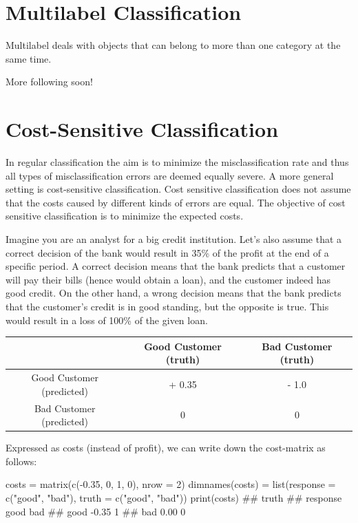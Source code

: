 \documentclass[12pt,]{scrbook}
\newenvironment{Shaded}{}{}
\newcommand{\DataTypeTok}[1]{#1}
\newcommand{\DecValTok}[1]{#1}
\newcommand{\FloatTok}[1]{#1}
\newcommand{\KeywordTok}[1]{\textcolor[rgb]{0.00,0.00,1.00}{#1}}
\newcommand{\NormalTok}[1]{#1}
\newcommand{\OperatorTok}[1]{#1}
\newcommand{\StringTok}[1]{\textcolor[rgb]{0.00,0.50,0.50}{#1}}
\begin{document}
\hypertarget{multilabel}{%
\section{Multilabel Classification}\label{multilabel}}

Multilabel deals with objects that can belong to more than one category at the same time.

More following soon!

\hypertarget{cost-sens}{%
\section{Cost-Sensitive Classification}\label{cost-sens}}

In regular classification the aim is to minimize the misclassification rate and thus all types of misclassification errors are deemed equally severe.
A more general setting is cost-sensitive classification.
Cost sensitive classification does not assume that the costs caused by different kinds of errors are equal.
The objective of cost sensitive classification is to minimize the expected costs.

Imagine you are an analyst for a big credit institution.
Let's also assume that a correct decision of the bank would result in 35\% of the profit at the end of a specific period.
A correct decision means that the bank predicts that a customer will pay their bills (hence would obtain a loan), and the customer indeed has good credit.
On the other hand, a wrong decision means that the bank predicts that the customer's credit is in good standing, but the opposite is true.
This would result in a loss of 100\% of the given loan.

\begin{longtable}[]{@{}ccc@{}}
\toprule
& Good Customer (truth) & Bad Customer (truth)\tabularnewline
\midrule
\endhead
Good Customer (predicted) & + 0.35 & - 1.0\tabularnewline
Bad Customer (predicted) & 0 & 0\tabularnewline
\bottomrule
\end{longtable}

Expressed as costs (instead of profit), we can write down the cost-matrix as follows:

\begin{Shaded}
\begin{Highlighting}[]
\NormalTok{costs =}\StringTok{ }\KeywordTok{matrix}\NormalTok{(}\KeywordTok{c}\NormalTok{(}\OperatorTok{-}\FloatTok{0.35}\NormalTok{, }\DecValTok{0}\NormalTok{, }\DecValTok{1}\NormalTok{, }\DecValTok{0}\NormalTok{), }\DataTypeTok{nrow =} \DecValTok{2}\NormalTok{)}
\KeywordTok{dimnames}\NormalTok{(costs) =}\StringTok{ }\KeywordTok{list}\NormalTok{(}\DataTypeTok{response =} \KeywordTok{c}\NormalTok{(}\StringTok{"good"}\NormalTok{, }\StringTok{"bad"}\NormalTok{), }\DataTypeTok{truth =} \KeywordTok{c}\NormalTok{(}\StringTok{"good"}\NormalTok{, }
  \StringTok{"bad"}\NormalTok{))}
\KeywordTok{print}\NormalTok{(costs)}
\NormalTok{##         truth}
\NormalTok{## response  good bad}
\NormalTok{##     good -0.35   1}
\NormalTok{##     bad   0.00   0}
\end{Highlighting}
\end{Shaded}
\end{document}
